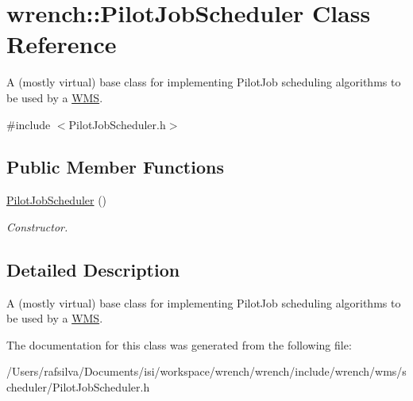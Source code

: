 \hypertarget{classwrench_1_1_pilot_job_scheduler}{}\section{wrench\+:\+:Pilot\+Job\+Scheduler Class Reference}
\label{classwrench_1_1_pilot_job_scheduler}


A (mostly virtual) base class for implementing Pilot\+Job scheduling algorithms to be used by a \hyperlink{classwrench_1_1_w_m_s}{W\+MS}.  




{\ttfamily \#include $<$Pilot\+Job\+Scheduler.\+h$>$}

\subsection*{Public Member Functions}
\begin{DoxyCompactItemize}
\item 
\mbox{\label{classwrench_1_1_pilot_job_scheduler_ab230034aa98439169dc78bcf82bfced8}} 
\hyperlink{classwrench_1_1_pilot_job_scheduler_ab230034aa98439169dc78bcf82bfced8}{Pilot\+Job\+Scheduler} ()
\begin{DoxyCompactList}\small\item\em Constructor. \end{DoxyCompactList}\end{DoxyCompactItemize}


\subsection{Detailed Description}
A (mostly virtual) base class for implementing Pilot\+Job scheduling algorithms to be used by a \hyperlink{classwrench_1_1_w_m_s}{W\+MS}. 

The documentation for this class was generated from the following file\+:\begin{DoxyCompactItemize}
\item 
/\+Users/rafsilva/\+Documents/isi/workspace/wrench/wrench/include/wrench/wms/scheduler/Pilot\+Job\+Scheduler.\+h\end{DoxyCompactItemize}
